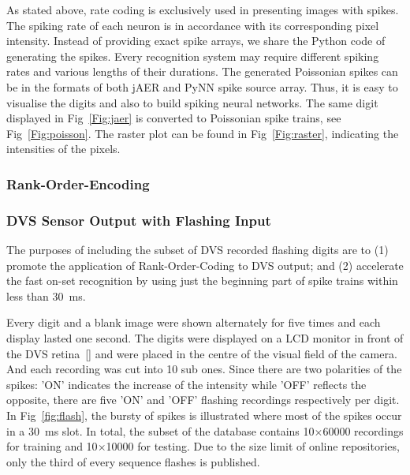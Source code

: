 	As stated above, rate coding is exclusively used in presenting images with spikes.
	The spiking rate of each neuron is in accordance with its corresponding pixel intensity.
	Instead of providing exact spike arrays, we share the Python code of generating the spikes.
	Every recognition system may require different spiking rates and various lengths of their durations.
	The generated Poissonian spikes can be in the formats of both jAER and PyNN spike source array.
	Thus, it is easy to visualise the digits and also to build spiking neural networks.
	The same digit displayed in Fig~\ref{Fig:jaer} is converted to Poissonian spike trains, see Fig~\ref{Fig:poisson}.
	The raster plot can be found in Fig~\ref{Fig:raster}, indicating the intensities of the pixels.

	
	\subsubsection{Rank-Order-Encoding}
  
	\subsubsection{DVS Sensor Output with Flashing Input}
	The purposes of including the subset of DVS recorded flashing digits are to (1) promote the application of Rank-Order-Coding to DVS output; and (2) accelerate the fast on-set recognition by using just the beginning part of spike trains within less than 30~ms.
	
	Every digit and a blank image were shown alternately for five times and each display lasted one second.
	The digits were displayed on a LCD monitor in front of the DVS retina~[\cite{serrano-gotarredona_128_2013}] and were placed in the centre of the visual field of the camera.
	And each recording was cut into 10 sub ones.
	Since there are two polarities of the spikes: 'ON' indicates the increase of the intensity while 'OFF' reflects the opposite, there are five 'ON' and 'OFF' flashing recordings respectively per digit.
	In Fig~\ref{fig:flash}, the bursty of spikes is illustrated where most of the spikes occur in a 30~ms slot. 
	In total, the subset of the database contains 10$\times$60000 recordings for training and 10$\times$10000 for testing.
	Due to the size limit of online repositories, only the third of every sequence flashes is published.

